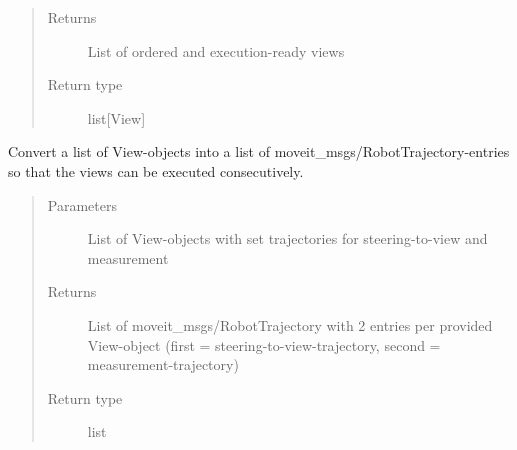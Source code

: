 \documentclass[letterpaper,10pt,english]{sphinxmanual}
\begin{document}
\begin{fulllineitems}
\begin{fulllineitems}
\begin{quote}
\begin{description}
\begin{itemize}
\end{itemize}

\item[{Returns}] \leavevmode
List of ordered and execution-ready views

\item[{Return type}] \leavevmode
list{[}View{]}

\end{description}\end{quote}

\end{fulllineitems}


\begin{fulllineitems}
\label{\detokenize{module_trajectory_manager:agiprobot_measurement.trajectory_manager.TrajectoryManager.convert_viewlist_to_execution_plan}}
Convert a list of View-objects into a list of moveit\_msgs/RobotTrajectory-entries so that the views can be executed consecutively.
\begin{quote}\begin{description}
\item[{Parameters}] \leavevmode
{} \textendash{} List of View-objects with set trajectories for steering-to-view and measurement

\item[{Returns}] \leavevmode
List of moveit\_msgs/RobotTrajectory with 2 entries per provided View-object (first = steering-to-view-trajectory, second = measurement-trajectory)

\item[{Return type}] \leavevmode
list

\end{description}\end{quote}

\end{fulllineitems}



\end{fulllineitems}
\end{document}
